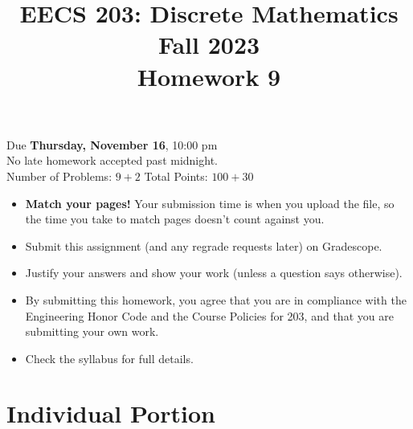 \documentclass[12pt]{exam}
\begin{document}
\title{EECS 203: Discrete Mathematics\\
  Fall 2023\\
  Homework 9}
\date{}
\author{}
\maketitle
\vspace{-50pt}
\begin{center}
  \huge Due \textbf{Thursday, November 16}, 10:00 pm\\
\Large No late homework accepted past midnight.\\
\vspace{10pt}
\large Number of Problems: $9+2$
\hspace{3cm}
Total Points: $100+30$
\end{center}
\vspace{25pt}
\begin{itemize}
    \item \textbf{Match your pages!} Your submission time is when you upload the file, so the time you take to match pages doesn't count against you.
    \item Submit this assignment (and any regrade requests later) on Gradescope. 
    \item Justify your answers and show your work (unless a question says otherwise).
    \item By submitting this homework, you agree that you are in compliance with the Engineering Honor Code and the Course Policies for 203, and that you are submitting your own work.
    \item Check the syllabus for full details.
\end{itemize}
\newpage

\section*{Individual Portion}
\end{document}
